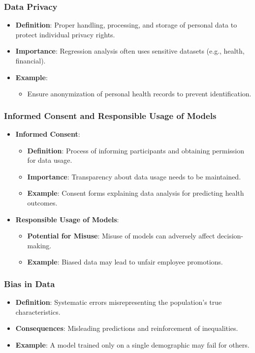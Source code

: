 \documentclass{beamer}
\begin{document}
\begin{frame}[fragile]
    \frametitle{Data Privacy}
    \begin{itemize}
        \item \textbf{Definition}: Proper handling, processing, and storage of personal data to protect individual privacy rights.
        \item \textbf{Importance}: Regression analysis often uses sensitive datasets (e.g., health, financial).
        \item \textbf{Example}: 
        \begin{itemize}
            \item Ensure anonymization of personal health records to prevent identification.
        \end{itemize}
    \end{itemize}
\end{frame}

\begin{frame}[fragile]
    \frametitle{Informed Consent and Responsible Usage of Models}
    \begin{itemize}
        \item \textbf{Informed Consent}:
        \begin{itemize}
            \item \textbf{Definition}: Process of informing participants and obtaining permission for data usage.
            \item \textbf{Importance}: Transparency about data usage needs to be maintained.
            \item \textbf{Example}: Consent forms explaining data analysis for predicting health outcomes.
        \end{itemize}
        
        \item \textbf{Responsible Usage of Models}:
        \begin{itemize}
            \item \textbf{Potential for Misuse}: Misuse of models can adversely affect decision-making.
            \item \textbf{Example}: Biased data may lead to unfair employee promotions.
        \end{itemize}
    \end{itemize}
\end{frame}

\begin{frame}[fragile]
    \frametitle{Bias in Data}
    \begin{itemize}
        \item \textbf{Definition}: Systematic errors misrepresenting the population's true characteristics.
        \item \textbf{Consequences}: Misleading predictions and reinforcement of inequalities.
        \item \textbf{Example}: A model trained only on a single demographic may fail for others.
    \end{itemize}
\end{frame}
\end{document}
